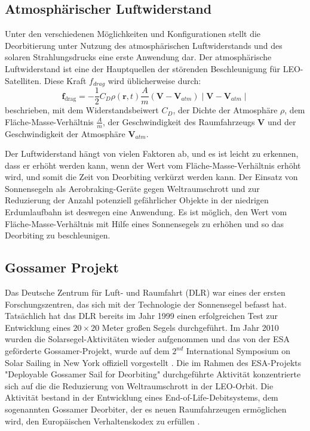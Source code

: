 \subsection{Atmosphärischer Luftwiderstand}
Unter den verschiedenen Möglichkeiten und Konfigurationen stellt die Deorbitierung unter Nutzung des atmosphärischen Luftwiderstands und des solaren Strahlungsdrucks eine erste Anwendung dar. Der atmosphärische Luftwiderstand ist eine der Hauptquellen der störenden Beschleunigung für LEO-Satelliten. Diese Kraft $f_{drag}$ wird üblicherweise durch:
\begin{equation}
	\boldsymbol{f}_{\text {drag}}=-\frac{1}{2} C_D \rho(\boldsymbol{r}, t) \frac{A}{m}\left(\boldsymbol{V}-\boldsymbol{V}_{a t m}\right) \mid\boldsymbol{V}-\boldsymbol{V}_{a t m} \mid
	\label{Luftreibung}
\end{equation}
beschrieben, mit dem Widerstandsbeiwert $C_D$, der Dichte der Atmosphäre $\rho$, dem Fläche-Masse-Verhältnis $\frac{A}{m}$, der Geschwindigkeit des Raumfahrzeugs $\boldsymbol{V}$ und der Geschwindigkeit der Atmosphäre $\boldsymbol{V}_{a t m}$.

Der Luftwiderstand hängt von vielen Faktoren ab, und es ist leicht zu erkennen, dass er erhöht werden kann, wenn der Wert vom Fläche-Masse-Verhältnis erhöht wird, und somit die Zeit von Deorbiting verkürzt werden kann. Der Einsatz von Sonnensegeln als Aerobraking-Geräte gegen Weltraumschrott und zur Reduzierung der Anzahl potenziell gefährlicher Objekte in der niedrigen Erdumlaufbahn ist deswegen eine Anwendung. Es ist möglich, den Wert vom Fläche-Masse-Verhältnis mit Hilfe eines Sonnensegels zu erhöhen und so das Deorbiting zu beschleunigen.

\subsection{Gossamer Projekt}
Das Deutsche Zentrum für Luft- und Raumfahrt (DLR) war eines der ersten Forschungszentren, das sich mit der Technologie der Sonnensegel befasst hat. Tatsächlich hat das DLR bereits im Jahr 1999 einen erfolgreichen Test zur Entwicklung eines $20\times20$ Meter großen Segels durchgeführt. Im Jahr 2010 wurden die Solarsegel-Aktivitäten wieder aufgenommen und das von der ESA geförderte Gossamer-Projekt, wurde auf dem $2^{nd}$ International Symposium on Solar Sailing in New York offiziell vorgestellt \citep{Geppert:2011}. Die im Rahmen des ESA-Projekts "Deployable Gossamer Sail for Deorbiting" durchgeführte Aktivität konzentrierte sich auf die die Reduzierung von Weltraumschrott in der LEO-Orbit. Die Aktivität bestand in der Entwicklung eines End-of-Life-Debitsystems, dem sogenannten Gossamer Deorbiter, der es neuen Raumfahrzeugen ermöglichen wird, den Europäischen Verhaltenskodex zu erfüllen \citep{FERNANDEZ:2014}.

